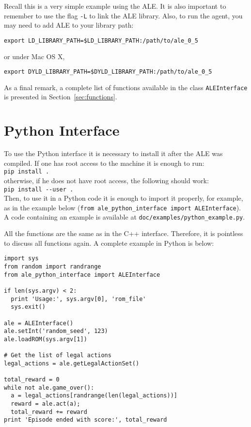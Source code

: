 \documentclass[12pt]{article}
\begin{document}
Recall this is a very simple example using the ALE. It is also important to remember to use the flag 
\verb+-L+ to link the ALE library. Also, to run the agent, you may need to add ALE to your library
path:

\begin{verbatim}
export LD_LIBRARY_PATH=$LD_LIBRARY_PATH:/path/to/ale_0_5
\end{verbatim}

or under Mac OS X,

\begin{verbatim}
export DYLD_LIBRARY_PATH=$DYLD_LIBRARY_PATH:/path/to/ale_0_5
\end{verbatim}

As a final remark, a complete list of functions available in the class \verb+ALEInterface+ is 
presented in Section~\ref{sec:functions}.

\section{Python Interface}\label{sec:python_interface}

To use the Python interface it is necessary to install it after the ALE was compiled. If one has 
root access to the machine it is enough to run:\\

\verb+pip install .+\\

otherwise, if he does not have root access, the following should work:\\

\verb+pip install --user .+\\

Then, to use it in a Python code it is enough to import it properly, for example, as in the 
example below (\verb+from ale_python_interface import ALEInterface+). A code containing
an example is available at \verb+doc/examples/python_example.py+.

All the functions are the same as in the C++ interface. Therefore, it is pointless to discuss all
functions again. A complete example in Python is below:

\begin{verbatim}
import sys
from random import randrange
from ale_python_interface import ALEInterface

if len(sys.argv) < 2:
  print 'Usage:', sys.argv[0], 'rom_file'
  sys.exit()

ale = ALEInterface()
ale.setInt('random_seed', 123)
ale.loadROM(sys.argv[1])

# Get the list of legal actions
legal_actions = ale.getLegalActionSet()

total_reward = 0
while not ale.game_over():
  a = legal_actions[randrange(len(legal_actions))]
  reward = ale.act(a);
  total_reward += reward
print 'Episode ended with score:', total_reward
\end{verbatim}
\end{document}
